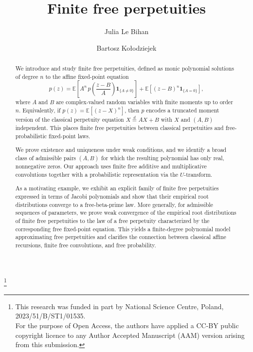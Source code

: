 \documentclass[a4paper,11pt]{amsart}
\numberwithin{equation}{section}
\newcommand{\E}{\mathbb{E}}
\begin{document}
\title{Finite free perpetuities}
\author{Julia Le Bihan}


\author[B. Ko\l{}odziejek]{Bartosz Ko\l{}odziejek}
\address{Faculty of Mathematics and Information Sciences, Warsaw University of Technology, Koszykowa 75, \mbox{00-662} Warsaw, Poland}

\thanks{This research was funded in part by National Science Centre, Poland, 2023/51/B/ST1/01535.
\\ For the purpose of Open Access, the authors have applied a CC-BY public copyright licence to any Author Accepted Manuscript (AAM) version arising from this submission.}



\begin{abstract}
We introduce and study finite free perpetuities, defined as monic polynomial solutions of degree \(n\) to the affine fixed-point equation 
\[
p(z)
=
\E\!\left[
A^{n}\,p\!\left(\frac{z-B}{A}\right)\mathbf{1}_{\{A\neq0\}}
\right]
+
\E\!\left[
(z-B)^n\mathbf{1}_{\{A=0\}}
\right],
\]
where \(A\) and \(B\) are complex-valued random variables with finite moments up to order \(n\).
Equivalently, if \(p(z)=\E[(z-X)^n]\), then \(p\) encodes a truncated moment version of the classical perpetuity equation \(X\stackrel{d}{=}AX+B\) with $X$ and $(A,B)$ independent.
This places finite free perpetuities between classical perpetuities and free-probabilistic fixed-point laws.

We prove existence and uniqueness under weak conditions, and we identify a broad class of admissible pairs $(A,B)$ for which the resulting polynomial has only real, nonnegative zeros.
Our approach uses finite free additive and multiplicative convolutions together with a probabilistic representation via the \(U\)-transform.

As a motivating example, we exhibit an explicit family of finite free perpetuities expressed in terms of Jacobi polynomials and show that their empirical root distributions converge to a free-beta-prime law.
More generally, for admissible sequences of parameters, we prove weak convergence of the empirical root distributions of finite free perpetuities to the law of a free perpetuity characterized by the corresponding free fixed-point equation.
This yields a finite-degree polynomial model approximating free perpetuities and clarifies the connection between classical affine recursions, finite free convolutions, and free probability.
\end{abstract}
\end{document}
